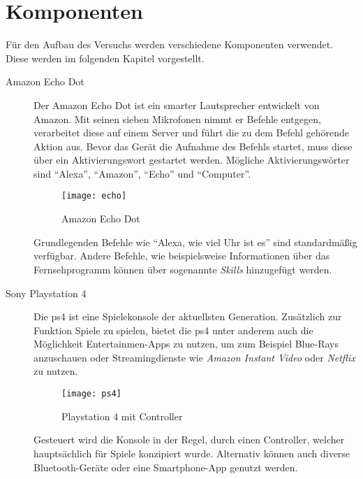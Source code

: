 \section{Komponenten}\label{sec:komponenten}
Für den Aufbau des Versuchs werden verschiedene Komponenten verwendet.
Diese werden im folgenden Kapitel vorgestellt.

\begin{description}
    \item[Amazon Echo Dot \cite{AmazonEc24:online}]
        Der Amazon Echo Dot ist ein smarter Lautsprecher entwickelt von Amazon.
        Mit seinen sieben Mikrofonen nimmt er Befehle entgegen, verarbeitet diese auf einem Server
        und führt die zu dem Befehl gehörende Aktion aus. Bevor das Gerät die Aufnahme des Befehls startet,
        muss diese über ein Aktivierungswort gestartet werden. Mögliche Aktivierungswörter sind
        \enquote{Alexa}, \enquote{Amazon}, \enquote{Echo} und \enquote{Computer}.

        \begin{figure}[h!]
            \centering
            \texttt{[image: echo]}
            \caption{Amazon Echo Dot}\label{fig:echo}
        \end{figure}

        Grundlegenden Befehle wie \enquote{Alexa, wie viel Uhr ist es} sind standardmäßig verfügbar.
        Andere Befehle,
        wie beispielsweise Informationen über das Fernsehprogramm können über sogenannte \textit{Skills} hinzugefügt werden.

    \item[Sony Playstation 4 \cite{PS4Welco38:online}]
        Die \ac{ps4} ist eine Spielekonsole der aktuellsten Generation.
        Zusätzlich zur Funktion Spiele zu spielen, bietet die \ac{ps4}
        unter anderem auch die Möglichkeit Entertainmen-Apps zu nutzen, um zum Beispiel Blue-Rays anzuschauen
        oder Streamingdienste wie \textit{Amazon Instant Video} oder \textit{Netflix} zu nutzen.

        \begin{figure}[h!]
            \centering
            \texttt{[image: ps4]}
            \caption{Playstation 4 mit Controller}\label{fig:ps4}
        \end{figure}

        Gesteuert wird die Konsole in der Regel, durch einen Controller, welcher hauptsächlich für Spiele konzipiert wurde.
        Alternativ können auch diverse Bluetooth-Geräte oder eine Smartphone-App genutzt werden.


\end{description}
